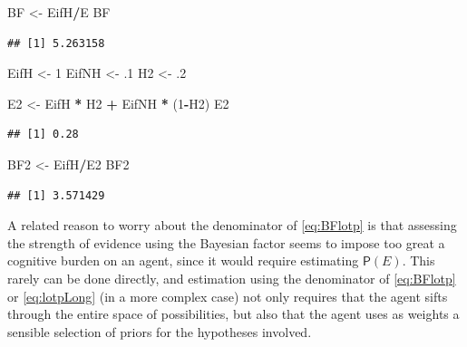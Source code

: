 \documentclass[10pt,dvipsnames,enabledeprecatedfontcommands]{scrartcl}
\newenvironment{Shaded}{\begin{snugshade}}{\end{snugshade}}
\newcommand{\DecValTok}[1]{\textcolor[rgb]{0.00,0.00,0.81}{#1}}
\newcommand{\FloatTok}[1]{\textcolor[rgb]{0.00,0.00,0.81}{#1}}
\newcommand{\NormalTok}[1]{#1}
\newcommand{\OperatorTok}[1]{\textcolor[rgb]{0.81,0.36,0.00}{\textbf{#1}}}
\newcommand{\StringTok}[1]{\textcolor[rgb]{0.31,0.60,0.02}{#1}}
\newcommand{\pr}[1]{\mathsf{P}(#1)}
\begin{document}
\begin{Shaded}
\begin{Highlighting}[]
\NormalTok{BF <-}\StringTok{ }\NormalTok{EifH}\OperatorTok{/}\NormalTok{E}
\NormalTok{BF}
\end{Highlighting}
\end{Shaded}

\begin{verbatim}
## [1] 5.263158
\end{verbatim}

\begin{Shaded}
\begin{Highlighting}[]
\NormalTok{EifH <-}\StringTok{ }\DecValTok{1}
\NormalTok{EifNH <-}\StringTok{ }\FloatTok{.1}
\NormalTok{H2 <-}\StringTok{ }\FloatTok{.2}

\NormalTok{E2 <-}\StringTok{ }\NormalTok{EifH }\OperatorTok{*}\StringTok{ }\NormalTok{H2 }\OperatorTok{+}\StringTok{ }\NormalTok{EifNH }\OperatorTok{*}\StringTok{ }\NormalTok{(}\DecValTok{1}\OperatorTok{-}\NormalTok{H2)}
\NormalTok{E2}
\end{Highlighting}
\end{Shaded}

\begin{verbatim}
## [1] 0.28
\end{verbatim}

\begin{Shaded}
\begin{Highlighting}[]
\NormalTok{BF2 <-}\StringTok{ }\NormalTok{EifH}\OperatorTok{/}\NormalTok{E2}
\NormalTok{BF2}
\end{Highlighting}
\end{Shaded}

\begin{verbatim}
## [1] 3.571429
\end{verbatim}

\normalsize

\noindent A related reason to worry about the denominator of
\eqref{eq:BFlotp} is that assessing the strength of evidence using the
Bayesian factor seems to impose too great a cognitive burden on an
agent, since it would require estimating \(\pr{E}\). This rarely can be
done directly, and estimation using the denominator of \eqref{eq:BFlotp}
or \eqref{eq:lotpLong} (in a more complex case) not only requires that
the agent sifts through the entire space of possibilities, but also that
the agent uses as weights a sensible selection of priors for the
hypotheses involved.
\end{document}
